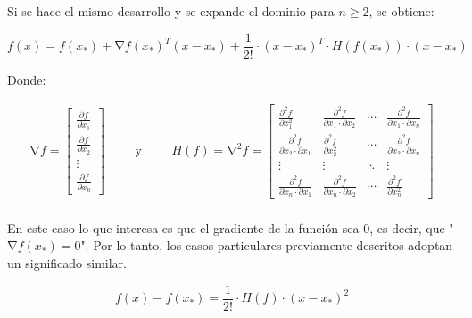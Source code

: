 Si se hace el mismo desarrollo y se expande el dominio para $n\geq{2}$, se obtiene:

\begin{equation}\label{TaylorNormal}
	f\left(x\right)=f\left(x_{*}\right)+\mathrm{\nabla}{f}{\left(x_{*}\right)}^{T}\left(x-x_{*}\right)+\frac{1}{2!}\cdot{\left(x-x_{*}\right)}^{T}\cdot{H}\left({f}\left(x_{*}\right)\right) 		\cdot\left(x-x_{*}\right)
\end{equation}

Donde:

\begin{equation*}
	\begin{aligned}
		\mathrm{\nabla}{f}=
	\begin{bmatrix}
		\frac{\partial{f}}{\partial{x}_1} \\
		\frac{\partial{f}}{\partial{x}_2}  \\
		\vdots \\
		\frac{\partial{f}}{\partial{x}_n}
	\end{bmatrix}
	\end{aligned}
	\qquad\text{y}\qquad
	\begin{aligned}
	{H}\left(f\right)=\mathrm{\nabla}^{2}{f}= 	
	\begin{bmatrix}
		\frac{\partial^{2}{f}}{\partial{x}_{1}^{2}} & \frac{\partial^{2}{f}}{\partial{x}_{1}\cdot\partial{x}_{2}} & \cdots & \frac{\partial^{2}{f}}{\partial{x}_{1}\cdot\partial{x}_{n}}\\
		\frac{\partial^{2}{f}}{\partial{x}_{2}\cdot\partial{x}_{1}} & \frac{\partial^{2}{f}}{\partial{x}_{2}^{2}} & \cdots & \frac{\partial^{2}{f}}{\partial{x}_{2}\cdot\partial{x}_{n}}\\
		\vdots & \vdots & \ddots & \vdots\\
		\frac{\partial^{2}{f}}{\partial{x}_{n}\cdot\partial{x}_{1}} & \frac{\partial^{2}{f}}{\partial{x}_{n}\cdot\partial{x}_{2}} & \cdots & \frac{\partial^{2}{f}}{\partial{x}_{n}^{2}}
	\end{bmatrix}
	\end{aligned}
\end{equation*}\\

En este caso lo que interesa es que el gradiente de la función sea 0, es decir, que "$\mathrm{\nabla}{f}{\left(x_{*}\right)}=0$". Por lo tanto, los casos particulares previamente descritos adoptan un significado similar. 

\begin{equation*}
	f\left(x\right)-f\left(x_{*}\right)=\frac{1}{2!}\cdot{H}\left(f\right)\cdot\left(x-x_{*}\right)^2 
\end{equation*}

